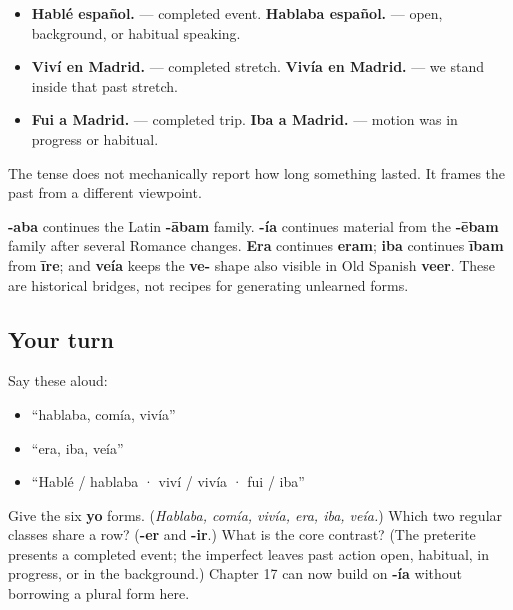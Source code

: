 \begin{grammarlens}[title={Grammar Lens: one scene, two frames}]
\begin{itemize}
\raggedright
  \item \textbf{Hablé español.} — completed event. \textbf{Hablaba español.} — open, background, or habitual speaking.
  \item \textbf{Viví en Madrid.} — completed stretch. \textbf{Vivía en Madrid.} — we stand inside that past stretch.
  \item \textbf{Fui a Madrid.} — completed trip. \textbf{Iba a Madrid.} — motion was in progress or habitual.
\end{itemize}

The tense does not mechanically report how long something lasted. It frames the past from a different viewpoint.
\end{grammarlens}

\begin{cousinweb}
\textbf{-aba} continues the Latin \textbf{-ābam} family. \textbf{-ía} continues material from the \textbf{-ēbam} family after several Romance changes. \textbf{Era} continues \textbf{eram}; \textbf{iba} continues \textbf{ībam} from \textbf{īre}; and \textbf{veía} keeps the \textbf{ve-} shape also visible in Old Spanish \textbf{veer}. These are historical bridges, not recipes for generating unlearned forms.
\end{cousinweb}

\subsection*{Your turn}
Say these aloud:

\begin{itemize}
\raggedright
  \item “hablaba, comía, vivía”
  \item “era, iba, veía”
  \item “Hablé / hablaba · viví / vivía · fui / iba”
\end{itemize}

\begin{tcolorbox}[breakable,colback=teal!4,colframe=teal!35!black,title={Before you move on}]
Give the six \textbf{yo} forms. (\emph{Hablaba, comía, vivía, era, iba, veía.}) Which two regular classes share a row? (\textbf{-er} and \textbf{-ir}.) What is the core contrast? (The preterite presents a completed event; the imperfect leaves past action open, habitual, in progress, or in the background.) Chapter 17 can now build on \textbf{-ía} without borrowing a plural form here.
\end{tcolorbox}
